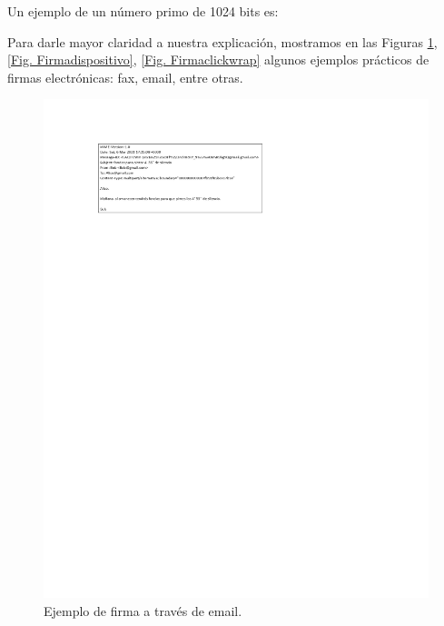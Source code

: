 \documentclass[12pt]{report} %
\begin{document}
Un ejemplo de un número primo de 1024 bits es:


Para darle mayor claridad a nuestra explicación, mostramos en las Figuras \ref{Fig. Firmaemail}, \ref{Fig. Firmadispositivo}, \ref{Fig. Firmaclickwrap} algunos ejemplos prácticos de firmas electrónicas: fax, email, entre otras. 




\begin{figure}
\centering
\includegraphics[width=0.85\columnwidth]{imagenes/firmaemail.pdf}
\caption{Ejemplo de firma a través de email.}
\label{Fig. Firmaemail}
\end{figure} 
\end{document}
